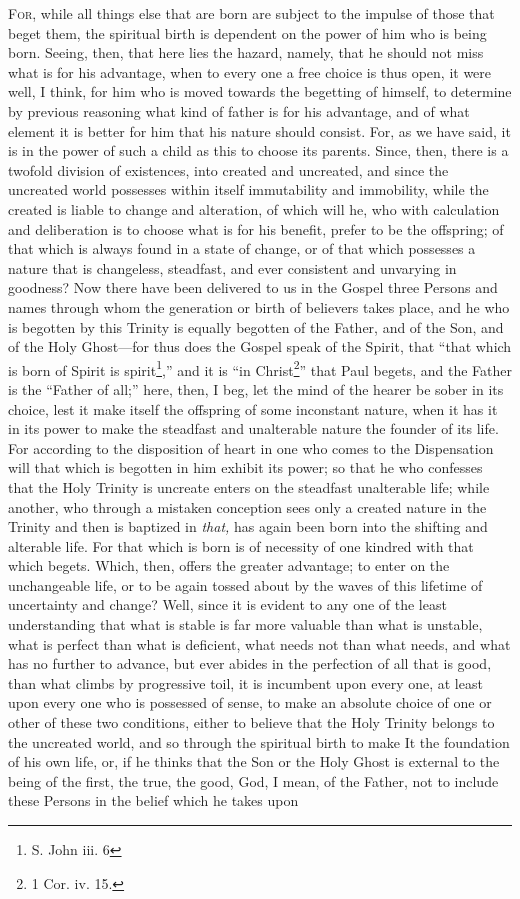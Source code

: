 \textsc{For}, while all things else that are born are subject to the impulse of those that beget them, the spiritual birth is dependent on the power of him who is being born. Seeing, then, that here lies the hazard, namely, that he should not miss what is for his advantage, when to every one a free choice is thus open, it were well, I think, for him who is moved towards the begetting of himself, to determine by previous reasoning what kind of father is for his advantage, and of what element it is better for him that his nature should consist. For, as we have said, it is in the power of such a child as this to choose its parents. Since, then, there is a twofold division of existences, into created and uncreated, and since the uncreated world possesses within itself immutability and immobility, while the created is liable to change and alteration, of which will he, who with calculation and deliberation is to choose what is for his benefit, prefer to be the offspring; of that which is always found in a state of change, or of that which possesses a nature that is changeless, steadfast, and ever consistent and unvarying in goodness? Now there have been delivered to us in the Gospel three Persons and names through whom the generation or birth of believers takes place, and he who is begotten by this Trinity is equally begotten of the Father, and of the Son, and of the Holy Ghost—for thus does the Gospel speak of the Spirit, that “that which is born of Spirit is spirit\footnote{S. John iii. 6},” and it is “in Christ\footnote{1 Cor. iv. 15.}” that Paul begets, and the Father is the “Father of all;” here, then, I beg, let the mind of the hearer be sober in its choice, lest it make itself the offspring of some inconstant nature, when it has it in its power to make the steadfast and unalterable nature the founder of its life. For according to the disposition of heart in one who comes to the Dispensation will that which is begotten in him exhibit its power; so that he who confesses that the Holy Trinity is uncreate enters on the steadfast unalterable life; while another, who through a mistaken conception sees only a created nature in the Trinity and then is baptized in \emph{that,} has again been born into the shifting and alterable life. For that which is born is of necessity of one kindred with that which begets. Which, then, offers the greater advantage; to enter on the unchangeable life, or to be again tossed about by the waves of this lifetime of uncertainty and change? Well, since it is evident to any one of the least understanding that what is stable is far more valuable than what is unstable, what is perfect than what is deficient, what needs not than what needs, and what has no further to advance, but ever abides in the perfection of all that is good, than what climbs by progressive toil, it is incumbent upon every one, at least upon every one who is possessed of sense, to make an absolute choice of one or other of these two conditions, either to believe that the Holy Trinity belongs to the uncreated world, and so through the spiritual birth to make It the foundation of his own life, or, if he thinks that the Son or the Holy Ghost is external to the being of the first, the true, the good, God, I mean, of the Father, not to include these Persons in the belief which he takes upon 